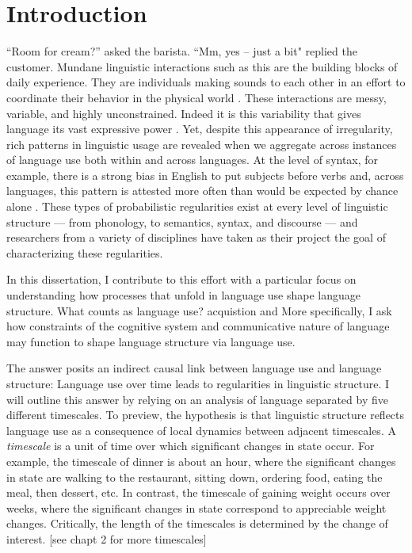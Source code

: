 
\chapter{Introduction}
\label{chapter:introduction}


``Room for cream?'' asked the barista. ``Mm, yes -- just a bit" replied the customer. Mundane linguistic interactions such as this are the building blocks of daily experience. They are individuals making sounds to each other in an effort to coordinate their behavior in the physical world \cite{clark2006social}. These interactions are messy, variable, and highly unconstrained. Indeed it is this variability that gives language its vast expressive power \cite{hockett1960}. Yet, despite this appearance of irregularity, rich patterns in linguistic usage are revealed when we aggregate across instances of language use both within and across languages. At the level of syntax, for example, there is a strong bias in English to put subjects before verbs and, across languages, this pattern is attested more often than would be expected by chance alone  \cite{dryer2005order}. These types of probabilistic regularities exist at every level of linguistic structure --- from phonology, to semantics, syntax, and discourse --- and researchers from a variety of disciplines have taken as their project the goal of characterizing these regularities.

In this dissertation, I contribute to this effort with a particular focus on understanding how processes that unfold in language use shape language structure. What counts as language use? acquistion and More specifically, I ask how constraints of the cognitive system and communicative nature of language may function to shape language structure via language use.  

The answer  posits an indirect causal link between language use and language structure: Language use over time leads to regularities in linguistic structure. I will outline this answer by relying on an analysis of language separated by five different timescales. To preview, the hypothesis is that linguistic structure reflects language use as a consequence of local dynamics between adjacent timescales. A {\it timescale} is a unit of time over which significant changes in state occur. For example, the timescale of dinner is about an hour, where the significant changes in state are walking to the restaurant, sitting down, ordering food, eating the meal, then dessert, etc. In contrast, the timescale of gaining weight occurs over weeks, where the significant changes in state correspond to appreciable weight changes. Critically, the length of the timescales is determined by the change of interest.  [see chapt 2 for more timescales]

